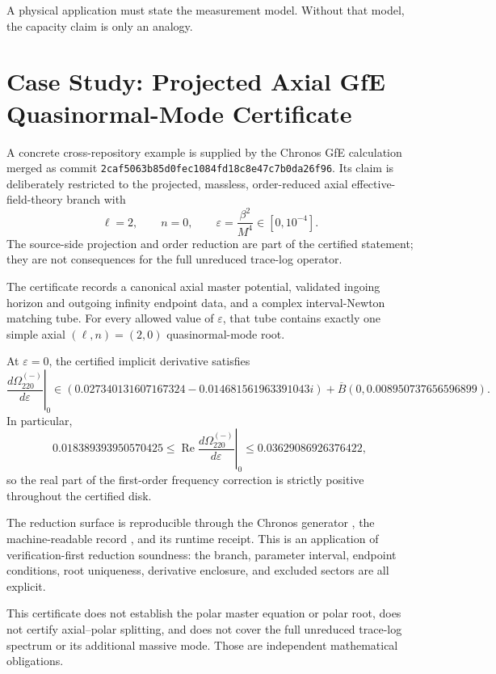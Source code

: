 A physical application must state the measurement model. Without that model,
the capacity claim is only an analogy.

\section{Case Study: Projected Axial GfE Quasinormal-Mode Certificate}

A concrete cross-repository example is supplied by the Chronos GfE calculation
merged as commit \texttt{2caf5063b85d0fec1084fd18c8e47c7b0da26f96}.  Its
claim is deliberately restricted to the projected, massless, order-reduced
axial effective-field-theory branch with
\[
\ell=2,\qquad n=0,\qquad
\varepsilon=\frac{\beta^2}{M^4}\in[0,10^{-4}].
\]
The source-side projection and order reduction are part of the certified
statement; they are not consequences for the full unreduced trace-log
operator.

\begin{example}
The certificate records a canonical axial master potential, validated ingoing
horizon and outgoing infinity endpoint data, and a complex interval-Newton
matching tube.  For every allowed value of \(\varepsilon\), that tube contains
exactly one simple axial \((\ell,n)=(2,0)\) quasinormal-mode root.

At \(\varepsilon=0\), the certified implicit derivative satisfies
\[
\left.\frac{d\Omega_{220}^{(-)}}{d\varepsilon}\right|_{0}
\in
(0.027340131607167324-0.014681561963391043i)
+\overline B(0,0.008950737656596899).
\]
In particular,
\[
0.018389393950570425
\le
\operatorname{Re}
\left.\frac{d\Omega_{220}^{(-)}}{d\varepsilon}\right|_{0}
\le
0.03629086926376422,
\]
so the real part of the first-order frequency correction is strictly positive
throughout the certified disk.
\end{example}

The reduction surface is reproducible through the Chronos generator
, the machine-readable
record
, and its
runtime receipt.  This is an application of verification-first reduction
soundness: the branch, parameter interval, endpoint conditions, root
uniqueness, derivative enclosure, and excluded sectors are all explicit.

\begin{remark}
This certificate does not establish the polar master equation or polar root,
does not certify axial--polar splitting, and does not cover the full unreduced
trace-log spectrum or its additional massive mode.  Those are independent
mathematical obligations.
\end{remark}


